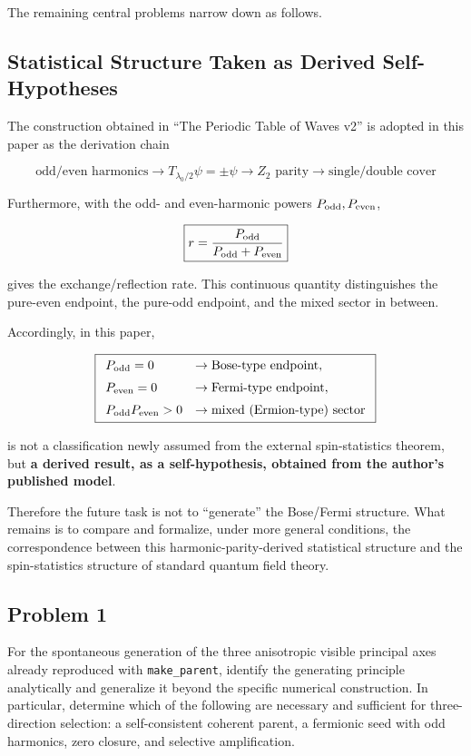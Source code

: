\documentclass[
  a4paper,
]{article}
\begin{document}
The remaining central problems narrow down as follows.

\subsection{Statistical Structure Taken as Derived
Self-Hypotheses}\label{statistical-structure-taken-as-derived-self-hypotheses}

The construction obtained in ``The Periodic Table of Waves v2'' is
adopted in this paper as the derivation chain

\[
\text{odd/even harmonics}
\longrightarrow
T_{\lambda_0/2}\psi=\pm\psi
\longrightarrow
Z_2\text{ parity}
\longrightarrow
\text{single/double cover}
\]

Furthermore, with the odd- and even-harmonic powers
\(P_{\rm odd},P_{\rm even}\),

\[
\boxed{
r=\frac{P_{\rm odd}}{P_{\rm odd}+P_{\rm even}}
}
\]

gives the exchange/reflection rate. This continuous quantity
distinguishes the pure-even endpoint, the pure-odd endpoint, and the
mixed sector in between.

Accordingly, in this paper,

\[
\boxed{
\begin{array}{ll}
P_{\rm odd}=0 &\rightarrow \text{Bose-type endpoint},\\[2mm]
P_{\rm even}=0 &\rightarrow \text{Fermi-type endpoint},\\[2mm]
P_{\rm odd}P_{\rm even}>0 &\rightarrow \text{mixed (Ermion-type) sector}
\end{array}
}
\]

is not a classification newly assumed from the external spin-statistics
theorem, but \textbf{a derived result, as a self-hypothesis, obtained
from the author's published model}.

Therefore the future task is not to ``generate'' the Bose/Fermi
structure. What remains is to compare and formalize, under more general
conditions, the correspondence between this harmonic-parity-derived
statistical structure and the spin-statistics structure of standard
quantum field theory.

\subsection{Problem 1}\label{problem-1}

For the spontaneous generation of the three anisotropic visible
principal axes already reproduced with \texttt{make\_parent}, identify
the generating principle analytically and generalize it beyond the
specific numerical construction. In particular, determine which of the
following are necessary and sufficient for three-direction selection: a
self-consistent coherent parent, a fermionic seed with odd harmonics,
zero closure, and selective amplification.
\end{document}

